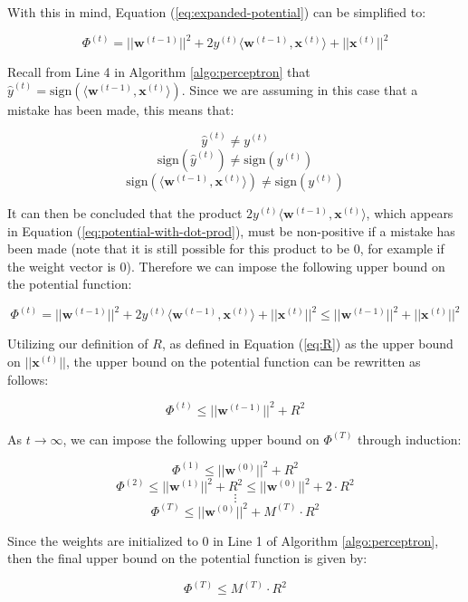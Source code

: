 \documentclass[11pt]{article}
\begin{document}
With this in mind, Equation (\ref{eq:expanded-potential}) can be simplified to:

\begin{equation}
\Phi^{(t)} = ||\boldsymbol{w}^{(t-1)}||^2 + 2y^{(t)}\langle\boldsymbol{w}^{(t-1)},\boldsymbol{x}^{(t)}\rangle + ||\boldsymbol{x}^{(t)}||^2
\label{eq:potential-with-dot-prod}
\end{equation}

Recall from Line 4 in Algorithm \ref{algo:perceptron} that $\hat{y}^{(t)} = \text{sign}\left(\langle\boldsymbol{w}^{(t-1)}, \boldsymbol{x}^{(t)}\rangle\right)$. Since we are assuming in this case that a mistake has been made, this means that:

$$\hat{y}^{(t)}\neq y^{(t)}$$
$$\text{sign}(\hat{y}^{(t)})\neq \text{sign}(y^{(t)})$$
$$\text{sign}\left(\langle\boldsymbol{w}^{(t-1)}, \boldsymbol{x}^{(t)}\rangle\right)\neq \text{sign}(y^{(t)})$$

It can then be concluded that the product $2y^{(t)}\langle\boldsymbol{w}^{(t-1)},\boldsymbol{x}^{(t)}\rangle$, which appears in Equation (\ref{eq:potential-with-dot-prod}), must be non-positive if a mistake has been made (note that it is still possible for this product to be $0$, for example if the weight vector is $0$). Therefore we can impose the following upper bound on the potential function:

$$\Phi^{(t)} = ||\boldsymbol{w}^{(t-1)}||^2 + 2y^{(t)}\langle\boldsymbol{w}^{(t-1)},\boldsymbol{x}^{(t)}\rangle + ||\boldsymbol{x}^{(t)}||^2 \leq
||\boldsymbol{w}^{(t-1)}||^2 + ||\boldsymbol{x}^{(t)}||^2
$$

Utilizing our definition of $R$, as defined in Equation (\ref{eq:R}) as the upper bound on $||\boldsymbol{x}^{(t)}||$, the upper bound on the potential function can be rewritten as follows:

$$\Phi^{(t)} \leq ||\boldsymbol{w}^{(t-1)}||^2 + R^2$$

As $t \rightarrow \infty$, we can impose the following upper bound on $\Phi^{(T)}$ through induction:

$$\Phi^{(1)} \leq ||\boldsymbol{w}^{(0)}||^2 + R^2$$
$$\Phi^{(2)} \leq ||\boldsymbol{w}^{(1)}||^2 + R^2 \leq ||\boldsymbol{w}^{(0)}||^2 + 2\cdot R^2 $$
$$\vdots$$
$$  \Phi^{(T)} \leq ||\boldsymbol{w}^{(0)}||^2 + M^{(T)}\cdot R^2$$

Since the weights are initialized to $0$ in Line 1 of Algorithm \ref{algo:perceptron}, then the final upper bound on the potential function is given by:

\begin{equation}
    \Phi^{(T)} \leq M^{(T)}\cdot R^2
    \label{eq:perceptron-upper-bound}
\end{equation}
\end{document}
